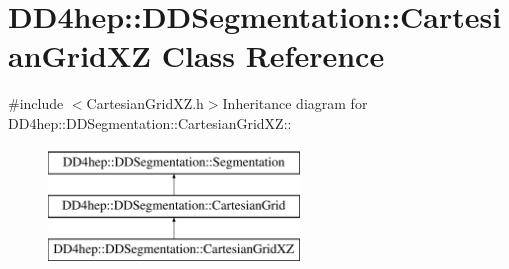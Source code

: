 \hypertarget{class_d_d4hep_1_1_d_d_segmentation_1_1_cartesian_grid_x_z}{
\section{DD4hep::DDSegmentation::CartesianGridXZ Class Reference}
\label{class_d_d4hep_1_1_d_d_segmentation_1_1_cartesian_grid_x_z}
}


{\ttfamily \#include $<$CartesianGridXZ.h$>$}Inheritance diagram for DD4hep::DDSegmentation::CartesianGridXZ::\begin{figure}[H]
\begin{center}
\leavevmode
\includegraphics[height=3cm]{class_d_d4hep_1_1_d_d_segmentation_1_1_cartesian_grid_x_z}
\end{center}
\end{figure}
